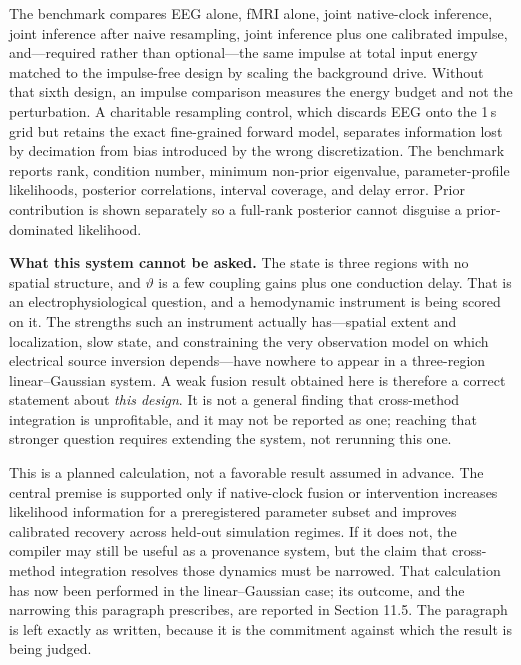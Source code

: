 The benchmark compares EEG alone, fMRI alone, joint native-clock inference,
joint inference after naive resampling, joint inference plus one calibrated
impulse, and---required rather than optional---the same impulse at total input
energy matched to the impulse-free design by scaling the background drive.
Without that sixth design, an impulse comparison measures the energy budget and
not the perturbation. A charitable resampling control, which discards EEG onto
the 1\,s grid but retains the exact fine-grained forward model, separates
information lost by decimation from bias introduced by the wrong
discretization. The benchmark reports rank, condition number, minimum non-prior
eigenvalue, parameter-profile likelihoods, posterior correlations, interval
coverage, and delay error. Prior contribution is shown separately so a
full-rank posterior cannot disguise a prior-dominated likelihood.

\textbf{What this system cannot be asked.} The state is three regions with no
spatial structure, and \(\vartheta\) is a few coupling gains plus one
conduction delay. That is an electrophysiological question, and a hemodynamic
instrument is being scored on it. The strengths such an instrument actually
has---spatial extent and localization, slow state, and constraining the very
observation model on which electrical source inversion depends---have nowhere
to appear in a three-region linear--Gaussian system. A weak fusion result
obtained here is therefore a correct statement about \emph{this design}. It is
not a general finding that cross-method integration is unprofitable, and it may
not be reported as one; reaching that stronger question requires extending the
system, not rerunning this one.

This is a planned calculation, not a favorable result assumed in advance. The
central premise is supported only if native-clock fusion or intervention
increases likelihood information for a preregistered parameter subset and
improves calibrated recovery across held-out simulation regimes. If it does
not, the compiler may still be useful as a provenance system, but the claim
that cross-method integration resolves those dynamics must be narrowed. That
calculation has now been performed in the linear--Gaussian case; its outcome,
and the narrowing this paragraph prescribes, are reported in Section 11.5. The
paragraph is left exactly as written, because it is the commitment against
which the result is being judged.

